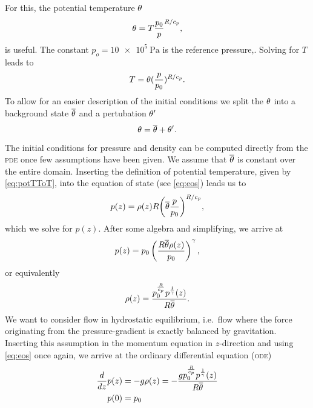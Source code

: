 For this, the potential temperature $\theta$
\begin{equation}
  \theta = T \frac{p_0}{p}^{R/c_p},
\end{equation}
is useful.
The constant $p_o = \SI{10e5}{\Pa}$ is the reference pressure,.
Solving for $T$ leads to
\begin{equation}
  \label{eq:potTToT}
  T = \theta (\frac{p}{p_0})^{R/c_p}.
\end{equation}
To allow for an easier description of the initial conditions we split the $\theta$ into a background state $\overline{\theta}$ and a pertubation $\theta'$
\begin{equation}
  \label{eq:potT-split}
  \theta = \overline{\theta} + \theta'.
\end{equation}

The initial conditions for pressure and density can be computed directly from the \textsc{pde} once few assumptions have been given.
We assume that $\overline{\theta}$ is constant over the entire domain.
Inserting the definition of potential temperature, given by \cref{eq:potTToT}, into the equation of state (see \cref{eq:eos}) leads us to
\begin{equation}
  p(z) = \rho(z) R {\left( \overline{\theta} \frac{p}{p_0}\right)}^{R/c_p},
\end{equation}
which we solve for $p(z)$.
After some algebra and simplifying, we arrive at
\begin{equation}
 p(z) = p_0 \left( \frac{R \overline{\theta} \rho(z)}{p_0} \right)^{\gamma},
\end{equation}
or equivalently
\begin{equation}
  \label{eq:eos-potT}
\rho(z) = \frac{p_{0}^{\frac{R}{c_{p}}} p^{\frac{1}{\gamma}}{\left (z \right )}}{R \overline{\theta}}.
\end{equation}
We want to consider flow in hydrostatic equilibrium, i.e.\ flow where the force originating from the pressure-gradient is exactly balanced by gravitation.
Inserting this assumption in the momentum equation in $z$-direction and using \cref{eq:eos} once again, we arrive at the ordinary differential equation (\textsc{ode})
\begin{align}
  \label{eq:hydrostatic-balance-potT}
  \begin{split}
  \frac{d}{d z} p{\left (z \right )} &= -g \rho(z)
                                     = 
        - \frac{g p_{0}^{\frac{R}{c_{p}}} p^{\frac{1}{\gamma}}{\left (z \right )}}{R \overline{\theta}}\\
  p{\left (0 \right )} &= p_0
  \end{split}
\end{align}
